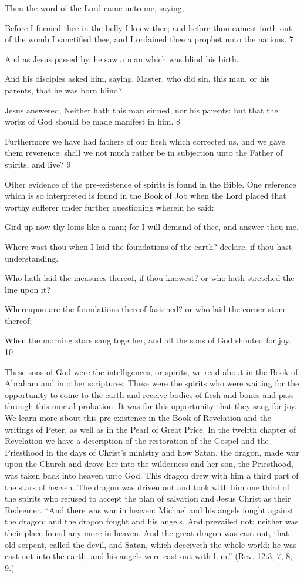 Then the word of the Lord came unto me, saying,

Before I formed thee in the belly I knew thee; and before thou camest forth out of the womb I
sanctified thee, and I ordained thee a prophet unto the nations. 7

And as Jesus passed by, he saw a man which was blind his birth.

And his disciples asked him, saying, Master, who did sin, this man, or his parents, that he
was born blind?

Jesus answered, Neither hath this man sinned, nor his parents: but that the works of God
should be made manifest in him. 8

Furthermore we have had fathers of our flesh which corrected us, and we gave them
reverence: shall we not much rather be in subjection unto the Father of spirits, and live? 9

Other evidence of the pre-existence of spirits is found in the Bible. One reference which is so
interpreted is found in the Book of Job when the Lord placed that worthy sufferer under
further questioning wherein he said:

Gird up now thy loins like a man; for I will demand of thee, and answer thou me.

Where wast thou when I laid the foundations of the earth? declare, if thou hast
understanding.

Who hath laid the measures thereof, if thou knowest? or who hath stretched the line upon it?

Whereupon are the foundations thereof fastened? or who laid the corner stone thereof;

When the morning stars sang together, and all the sons of God shouted for joy. 10

These sons of God were the intelligences, or spirits, we read about in the Book of Abraham
and in other scriptures. These were the spirits who were waiting for the opportunity to come
to the earth and receive bodies of flesh and bones and pass through this mortal probation. It
was for this opportunity that they sang for joy. We learn more about this pre-existence in the
Book of Revelation and the writings of Peter, as well as in the Pearl of Great Price. In the
twelfth chapter of Revelation we have a description of the restoration of the Gospel and the
Priesthood in the days of Christ's ministry and how Satan, the dragon, made war upon the
Church and drove her into the wilderness and her son, the Priesthood, was taken back into
heaven unto God. This dragon drew with him a third part of the stars of heaven. The dragon
was driven out and took with him one third of the spirits who refused to accept the plan of
salvation and Jesus Christ as their Redeemer. ``And there was war in heaven: Michael and his
angels fought against the dragon; and the dragon fought and his angels, And prevailed not;
neither was their place found any more in heaven. And the great dragon was cast out, that old
serpent, called the devil, and Satan, which deceiveth the whole world: he was cast out into
the earth, and his angels were cast out with him.'' (Rev. 12:3, 7, 8, 9.)

